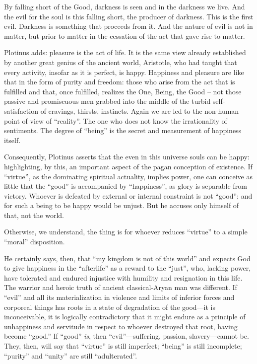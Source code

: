 \begin{quotex}
By falling short of the Good, darkness is seen and in the darkness we live. And the evil for the soul is this falling short, the producer of darkness. This is the first evil. Darkness is something that proceeds from it. And the nature of evil is not in matter, but prior to matter in the cessation of the act that gave rise to matter.
\end{quotex}

Plotinus adds: pleasure is the act of life. It is the same view already established by another great genius of the ancient world, Aristotle, who had taught that every activity, insofar as it is perfect, is happy. Happiness and pleasure are like that in the form of purity and freedom: those who arise from the act that is fulfilled and that, once fulfilled, realizes the One, Being, the Good -- not those passive and promiscuous men grabbed into the middle of the turbid self-satisfaction of cravings, thirsts, instincts. Again we are led to the non-human point of view of ``reality''. The one who does not know the irrationality of sentiments. The degree of ``being'' is the secret and measurement of happiness itself.

Consequently, Plotinus asserts that the even in this universe souls can be happy: highlighting, by this, an important aspect of the pagan conception of existence. If ``virtue'', as the dominating spiritual actuality, implies power, one can conceive as little that the ``good'' is accompanied by ``happiness'', as glory is separable from victory. Whoever is defeated by external or internal constraint is not ``good'': and for such a being to be happy would be unjust. But he accuses only himself of that, not the world.

Otherwise, we understand, the thing is for whoever reduces ``virtue'' to a simple ``moral'' disposition.

He certainly says, then, that ``my kingdom is not of this world'' and expects God to give happiness in the ``afterlife'' as a reward to the ``just'', who, lacking power, have tolerated and endured injustice with humility and resignation in this life. The warrior and heroic truth of ancient classical-Aryan man was different. If ``evil'' and all its materialization in violence and limits of inferior forces and corporeal things has roots in a state of degradation of the good---it is inconceivable, it is logically contradictory that it might endure as a principle of unhappiness and servitude in respect to whoever destroyed that root, having become ``good.'' If ``good'' \emph{is}, then ``evil''---suffering, passion, slavery---cannot be. They, then, will say that ``virtue'' is still imperfect; ``being'' is still incomplete; ``purity'' and ``unity'' are still ``adulterated''.

